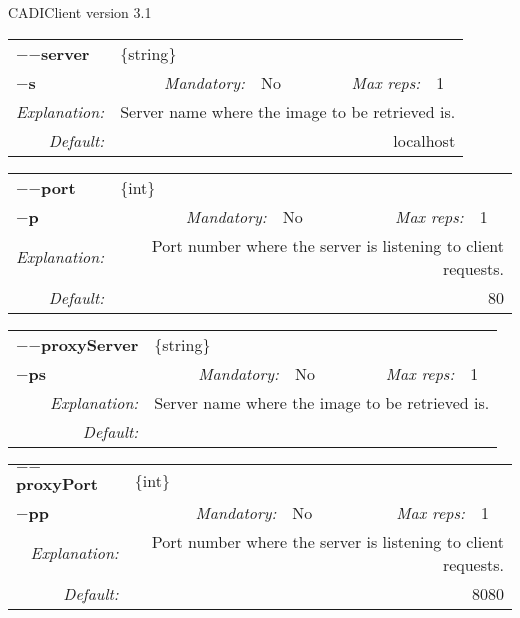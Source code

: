 CADIClient version 3.1

\begin{center}\begin{tabular}{|rr|rl|rl|}
\hline
\multicolumn{2}{|l|}{\textbf{$-$$-$server}} & \multicolumn{4}{|l|}{$\{$string$\}$} \\
\cline{3-6}
\multicolumn{2}{|l|}{\textbf{$-$s}} & \emph{Mandatory:} & No & \emph{Max reps:} & 1 \\
\hline
\emph{Explanation:} & \multicolumn{5}{|p{12cm}|}{Server name where the image to be retrieved is.} \\
\hline
\emph{Default:} & \multicolumn{5}{|p{12cm}|}{localhost} \\
\hline
\end{tabular}\end{center}
\begin{center}\begin{tabular}{|rr|rl|rl|}
\hline
\multicolumn{2}{|l|}{\textbf{$-$$-$port}} & \multicolumn{4}{|l|}{$\{$int$\}$} \\
\cline{3-6}
\multicolumn{2}{|l|}{\textbf{$-$p}} & \emph{Mandatory:} & No & \emph{Max reps:} & 1 \\
\hline
\emph{Explanation:} & \multicolumn{5}{|p{12cm}|}{Port number where the server is listening to client requests.} \\
\hline
\emph{Default:} & \multicolumn{5}{|p{12cm}|}{80} \\
\hline
\end{tabular}\end{center}
\begin{center}\begin{tabular}{|rr|rl|rl|}
\hline
\multicolumn{2}{|l|}{\textbf{$-$$-$proxyServer}} & \multicolumn{4}{|l|}{$\{$string$\}$} \\
\cline{3-6}
\multicolumn{2}{|l|}{\textbf{$-$ps}} & \emph{Mandatory:} & No & \emph{Max reps:} & 1 \\
\hline
\emph{Explanation:} & \multicolumn{5}{|p{12cm}|}{Server name where the image to be retrieved is.} \\
\hline
\emph{Default:} & \multicolumn{5}{|p{12cm}|}{} \\
\hline
\end{tabular}\end{center}
\begin{center}\begin{tabular}{|rr|rl|rl|}
\hline
\multicolumn{2}{|l|}{\textbf{$-$$-$proxyPort}} & \multicolumn{4}{|l|}{$\{$int$\}$} \\
\cline{3-6}
\multicolumn{2}{|l|}{\textbf{$-$pp}} & \emph{Mandatory:} & No & \emph{Max reps:} & 1 \\
\hline
\emph{Explanation:} & \multicolumn{5}{|p{12cm}|}{Port number where the server is listening to client requests.} \\
\hline
\emph{Default:} & \multicolumn{5}{|p{12cm}|}{8080} \\
\hline
\end{tabular}\end{center}
